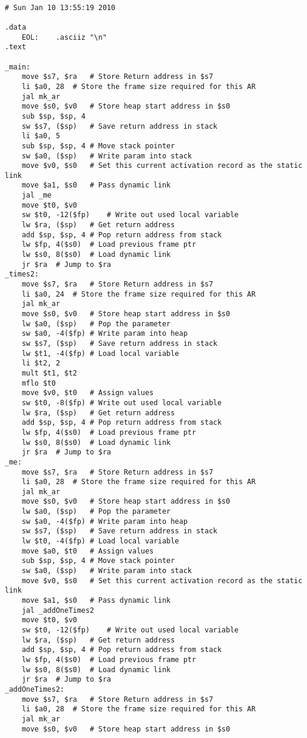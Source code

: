 \begin{lstlisting}[showstringspaces=false,breaklines=true,backgroundcolor=\color{light-gray}, captionpos=b]
         
# Sun Jan 10 13:55:19 2010

.data
	EOL:	.asciiz "\n"
.text

_main:
	move $s7, $ra	# Store Return address in $s7
	li $a0, 28	# Store the frame size required for this AR
	jal mk_ar
	move $s0, $v0	# Store heap start address in $s0
	sub $sp, $sp, 4
	sw $s7, ($sp)	# Save return address in stack
	li $a0, 5
	sub $sp, $sp, 4	# Move stack pointer
	sw $a0, ($sp)	# Write param into stack
	move $v0, $s0	# Set this current activation record as the static link
	move $a1, $s0	# Pass dynamic link
	jal _me
	move $t0, $v0
	sw $t0, -12($fp)	# Write out used local variable
	lw $ra, ($sp)	# Get return address
	add $sp, $sp, 4	# Pop return address from stack
	lw $fp, 4($s0)	# Load previous frame ptr
	lw $s0, 8($s0)	# Load dynamic link
	jr $ra	# Jump to $ra
_times2:
	move $s7, $ra	# Store Return address in $s7
	li $a0, 24	# Store the frame size required for this AR
	jal mk_ar
	move $s0, $v0	# Store heap start address in $s0
	lw $a0, ($sp)	# Pop the parameter
	sw $a0, -4($fp)	# Write param into heap
	sw $s7, ($sp)	# Save return address in stack
	lw $t1, -4($fp)	# Load local variable
	li $t2, 2
	mult $t1, $t2
	mflo $t0
	move $v0, $t0	# Assign values
	sw $t0, -8($fp)	# Write out used local variable
	lw $ra, ($sp)	# Get return address
	add $sp, $sp, 4	# Pop return address from stack
	lw $fp, 4($s0)	# Load previous frame ptr
	lw $s0, 8($s0)	# Load dynamic link
	jr $ra	# Jump to $ra
_me:
	move $s7, $ra	# Store Return address in $s7
	li $a0, 28	# Store the frame size required for this AR
	jal mk_ar
	move $s0, $v0	# Store heap start address in $s0
	lw $a0, ($sp)	# Pop the parameter
	sw $a0, -4($fp)	# Write param into heap
	sw $s7, ($sp)	# Save return address in stack
	lw $t0, -4($fp)	# Load local variable
	move $a0, $t0	# Assign values
	sub $sp, $sp, 4	# Move stack pointer
	sw $a0, ($sp)	# Write param into stack
	move $v0, $s0	# Set this current activation record as the static link
	move $a1, $s0	# Pass dynamic link
	jal _addOneTimes2
	move $t0, $v0
	sw $t0, -12($fp)	# Write out used local variable
	lw $ra, ($sp)	# Get return address
	add $sp, $sp, 4	# Pop return address from stack
	lw $fp, 4($s0)	# Load previous frame ptr
	lw $s0, 8($s0)	# Load dynamic link
	jr $ra	# Jump to $ra
_addOneTimes2:
	move $s7, $ra	# Store Return address in $s7
	li $a0, 28	# Store the frame size required for this AR
	jal mk_ar
	move $s0, $v0	# Store heap start address in $s0

\end{lstlisting}
